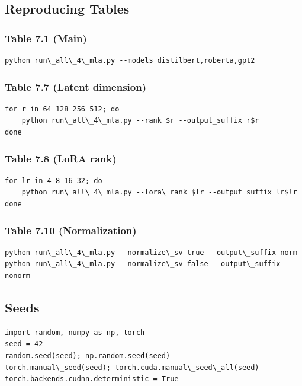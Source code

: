 \subsection{Reproducing Tables}

\subsubsection{Table 7.1 (Main)}
\begin{lstlisting}
python run\_all\_4\_mla.py --models distilbert,roberta,gpt2
\end{lstlisting}

\subsubsection{Table 7.7 (Latent dimension)}
\begin{lstlisting}
for r in 64 128 256 512; do
    python run\_all\_4\_mla.py --rank $r --output_suffix r$r
done
\end{lstlisting}

\subsubsection{Table 7.8 (LoRA rank)}
\begin{lstlisting}
for lr in 4 8 16 32; do
    python run\_all\_4\_mla.py --lora\_rank $lr --output_suffix lr$lr
done
\end{lstlisting}

\subsubsection{Table 7.10 (Normalization)}
\begin{lstlisting}
python run\_all\_4\_mla.py --normalize\_sv true --output\_suffix norm
python run\_all\_4\_mla.py --normalize\_sv false --output\_suffix nonorm
\end{lstlisting}

\subsection{Seeds}

\begin{lstlisting}
import random, numpy as np, torch
seed = 42
random.seed(seed); np.random.seed(seed)
torch.manual\_seed(seed); torch.cuda.manual\_seed\_all(seed)
torch.backends.cudnn.deterministic = True
\end{lstlisting}

